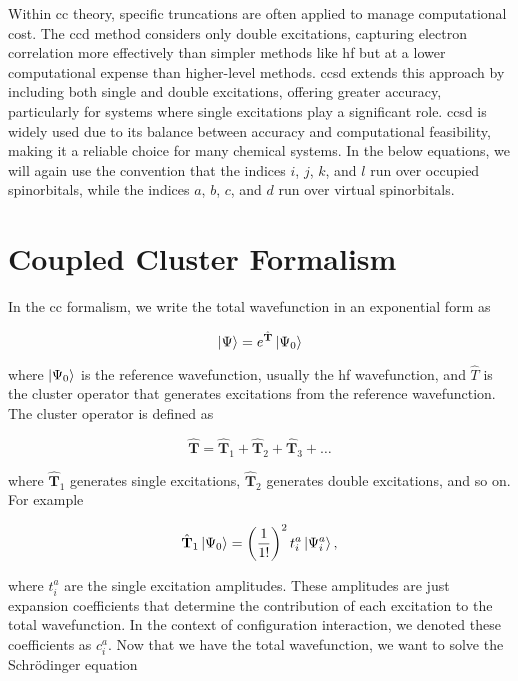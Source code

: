 Within \acrshort{cc} theory, specific truncations are often applied to manage computational cost. The \acrfull{ccd} method considers only double excitations, capturing electron correlation more effectively than simpler methods like \acrshort{hf} but at a lower computational expense than higher-level methods. \acrfull{ccsd} extends this approach by including both single and double excitations, offering greater accuracy, particularly for systems where single excitations play a significant role. \acrshort{ccsd} is widely used due to its balance between accuracy and computational feasibility, making it a reliable choice for many chemical systems. In the below equations, we will again use the convention that the indices \(i\), \(j\), \(k\), and \(l\) run over occupied spinorbitals, while the indices \(a\), \(b\), \(c\), and \(d\) run over virtual spinorbitals.

\section{Coupled Cluster Formalism}

In the \acrshort{cc} formalism, we write the total wavefunction in an exponential form as

\begin{equation}
\ket{\Psi}=e^{\hat{\mathbf{T}}}\ket{\Psi_0}
\end{equation}

where \(\ket{\Psi_0}\) is the reference wavefunction, usually the \acrshort{hf} wavefunction, and \(\hat{T}\) is the cluster operator that generates excitations from the reference wavefunction. The cluster operator is defined as

\begin{equation}
\hat{\mathbf{T}}=\hat{\mathbf{T}}_1+\hat{\mathbf{T}}_2+\hat{\mathbf{T}}_3+\dots
\end{equation}

where \(\hat{\mathbf{T}}_1\) generates single excitations, \(\hat{\mathbf{T}}_2\) generates double excitations, and so on. For example

\begin{equation}
\hat{\mathbf{T}}_1\ket{\Psi_0}=\left(\frac{1}{1!}\right)^2t_i^a\ket{\Psi_i^a},
\end{equation}

where \(t_i^a\) are the single excitation amplitudes. These amplitudes are just expansion coefficients that determine the contribution of each excitation to the total wavefunction. In the context of configuration interaction, we denoted these coefficients as \(c_i^a\). Now that we have the total wavefunction, we want to solve the Schrödinger equation

